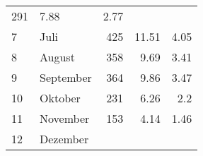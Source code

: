 \begin{longtable}{lXrrr}
       \num{291} &
       \num[round-mode=places,round-precision=2]{7.88} &
         \num[round-mode=places,round-precision=2]{2.77} \\

     7 &
     \multicolumn{1}{X}{ Juli   } &


       \num{425} &
       \num[round-mode=places,round-precision=2]{11.51} &
         \num[round-mode=places,round-precision=2]{4.05} \\

     8 &
     \multicolumn{1}{X}{ August   } &


       \num{358} &
       \num[round-mode=places,round-precision=2]{9.69} &
         \num[round-mode=places,round-precision=2]{3.41} \\

     9 &
     \multicolumn{1}{X}{ September   } &


       \num{364} &
       \num[round-mode=places,round-precision=2]{9.86} &
         \num[round-mode=places,round-precision=2]{3.47} \\

     10 &
     \multicolumn{1}{X}{ Oktober   } &


       \num{231} &
       \num[round-mode=places,round-precision=2]{6.26} &
         \num[round-mode=places,round-precision=2]{2.2} \\

     11 &
     \multicolumn{1}{X}{ November   } &


       \num{153} &
       \num[round-mode=places,round-precision=2]{4.14} &
         \num[round-mode=places,round-precision=2]{1.46} \\

     12 &
     \multicolumn{1}{X}{ Dezember   } &



\end{longtable}
